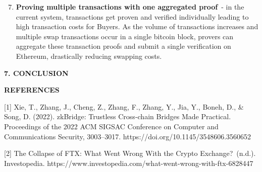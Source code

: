 \documentclass[
]{article}
\providecommand{\tightlist}{%
  \setlength{\itemsep}{0pt}\setlength{\parskip}{0pt}}
\begin{document}
{{{}

\begin{enumerate}
\setcounter{enumi}{6}
\tightlist
\item
  \textbf{Proving multiple transactions with one aggregated proof}{~- in the
  current system, transactions get proven and verified individually
  leading to high transaction costs for Buyers. As the volume of
  transactions increases and multiple swap transactions occur in a
  single bitcoin block, provers can aggregate these transaction proofs
  and submit a single verification on Ethereum, drastically reducing
  swapping costs.}
\end{enumerate}

{}
{}{}\vspace*{\baselineskip}
\begin{center}
\textbf{7. CONCLUSION}
\end{center}

{}{}\vspace*{\baselineskip}


{}

\hspace*{3em}{In summary, we've proposed a protocol that allows for direct, trustless
swaps between Bitcoin and Ethereum without relying on security
compromising intermediaries. We combined a novel Bitcoin ZK light client
implementation with an on chain order book and escrow smart contract to
create a cross-chain decentralized exchange. The protocol ensures the
same level of security as the Bitcoin and Ethereum networks, and is
highly resilient, as it does not rely on staked capital or third parties
to submit proofs. Rift can be deployed to any Ethereum Virtual Machine
(EVM) chain, allowing liquidity to flow seamlessly between Bitcoin and
Ethereum's ecosystem for the first time.}


{}{}\vspace*{\baselineskip}
\begin{center}
\textbf{REFERENCES}
\end{center}

{}{}\vspace*{\baselineskip}
{}

{{[}1{]} Xie, T., Zhang, J., Cheng, Z., Zhang, F., Zhang, Y., Jia, Y.,
Boneh, D., \& Song, D. (2022). zkBridge: Trustless Cross-chain Bridges Made Practical. }{Proceedings of the 2022 ACM
SIGSAC Conference on Computer and Communications Security}{,
3003--3017.}{ https://doi.org/10.1145/3548606.3560652}}

{}

{{[}2{]} }{The Collapse of FTX: What Went Wrong With the Crypto
Exchange?}{~(n.d.). Investopedia. https://www.investopedia.com/what-went-wrong-with-ftx-6828447}}
\end{document}
